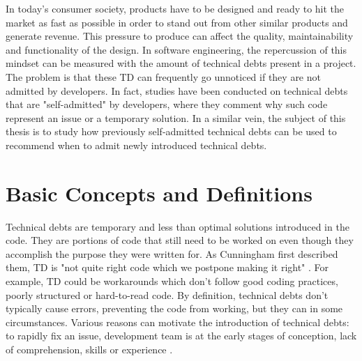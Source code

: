 

\label{sec:Introduction}  


\setlength{\parindent}{5ex} In today's consumer society, products have to be designed and ready to hit the market as fast as possible in order to stand out from other similar products and generate revenue. This pressure to produce can affect the quality, maintainability and functionality of the design. In software engineering, the repercussion of this mindset can be measured with the amount of technical debts present in a project. The problem is that these \ac{TD} can frequently go unnoticed if they are not admitted by developers. In fact, studies have been conducted on technical debts that are "self-admitted" by developers, where they comment why such code represent an issue or a temporary solution. In a similar vein, the subject of this thesis is to study how previously self-admitted technical debts can be used to recommend when to admit newly introduced technical debts.

\section{Basic Concepts and Definitions}  


\setlength{\parindent}{5ex} Technical debts are temporary and less than optimal solutions introduced in the code. They are portions of code that still need to be worked on even though they accomplish the purpose they were written for. As Cunningham first described them, \ac{TD} is "not quite right code which we postpone making it right" \citep{Cunningham:1992:WPM:157709.157715}. For example, \ac{TD} could be workarounds which don't follow good coding practices, poorly structured or hard-to-read code. By definition, technical debts don't typically cause errors, preventing the code from working, but they can in some circumstances. Various reasons can motivate the introduction of technical debts: to rapidly fix an issue, development team is at the early stages of conception, lack of comprehension, skills or experience \citep{Suryanarayana20151}. \par

